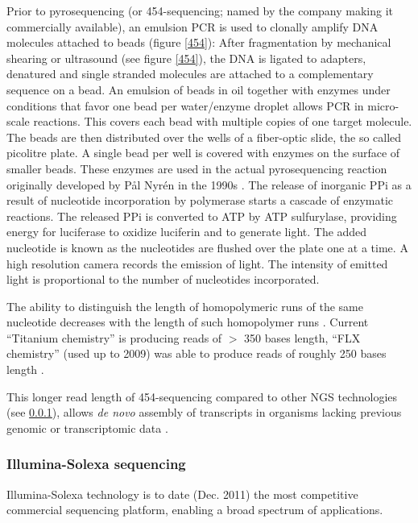 Prior to pyrosequencing (or 454-sequencing; named by the company
making it commercially available), an emulsion PCR is used to clonally
amplify DNA molecules attached to beads (figure \ref{454}): After
fragmentation by mechanical shearing or ultrasound \cite{pmid20298868}
(see figure \ref{454}), the DNA is ligated to adapters, denatured and
single stranded molecules are attached to a complementary sequence on
a bead. An emulsion of beads in oil together with enzymes under
conditions that favor one bead per water/enzyme droplet allows PCR in
micro-scale reactions. This covers each bead with multiple copies of
one target molecule. The beads are then distributed over the wells of
a fiber-optic slide, the so called picolitre plate. A single bead per
well is covered with enzymes on the surface of smaller beads. These
enzymes are used in the actual pyrosequencing reaction originally
developed by P\r{a}l Nyr\'{e}n in the 1990s \cite{pmid17185753}. The
release of inorganic PPi as a result of nucleotide incorporation by
polymerase starts a cascade of enzymatic reactions. The released PPi
is converted to ATP by ATP sulfurylase, providing energy for
luciferase to oxidize luciferin and to generate light. The added
nucleotide is known as the nucleotides are flushed over the plate one
at a time. A high resolution camera records the emission of light. The
intensity of emitted light is proportional to the number of
nucleotides incorporated.

The ability to distinguish the length of homopolymeric runs of the
same nucleotide decreases with the length of such homopolymer runs
\cite{pmid21685085}. Current ``Titanium chemistry'' is producing reads
of $>$ 350 bases length, ``FLX chemistry'' (used up to 2009) was able
to produce reads of roughly 250 bases length \cite{pmid21514329}.

This longer read length of 454-sequencing \cite{pmid16056220} compared
to other NGS technologies (see \ref{sec:ill-seq}), allows \textit{de
  novo} assembly of transcripts in organisms lacking previous genomic
or transcriptomic data \cite{pmid20950480}.

\subsubsection{Illumina-Solexa sequencing}
\label{sec:ill-seq}

Illumina-Solexa technology is to date (Dec. 2011) the most competitive
commercial sequencing platform, enabling a broad spectrum of
applications.

